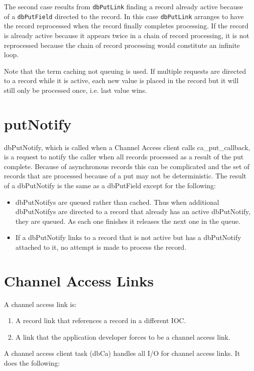 The second case results from \verb|dbPutLink| finding a record already active because of a \verb|dbPutField| directed to the 
record. In this case \verb|dbPutLink| arranges to have the record reprocessed when the record finally completes processing. If 
the record is already active because it appears twice in a chain of record processing, it is not reprocessed because the chain 
of record processing would constitute an infinite loop.

Note that the term caching not queuing is used. If multiple requests are directed to a record while it is active, each new 
value is placed in the record but it will still only be processed once, i.e. last value wins.

\section{putNotify}

dbPutNotify, which is called when a Channel Access client calls ca\_put\_callback, is a request to notify the caller when all 
records processed as a result of the put complete. Because of asynchronous records this can be complicated and the set of 
records that are processed because of a put may not be deterministic. The result of a dbPutNotify is the same as a 
dbPutField except for the following:

\begin{itemize}\item dbPutNotifys are queued rather than cached. Thus when additional dbPutNotifys are directed to a record that 
already has an active dbPutNotify, they are queued. As each one finishes it releases the next one in the queue.

\item If a dbPutNotify links to a record that is not active but has a dbPutNotify attached to it, no attempt is made to 
process the record.

\end{itemize}\section{Channel Access Links}

A channel access link is:

\begin{enumerate}\item A record link that references a record in a different IOC.

\item A link that the application developer forces to be a channel access link.

\end{enumerate}A channel access client task (dbCa)  handles all I/O for channel access links. It does the following:

